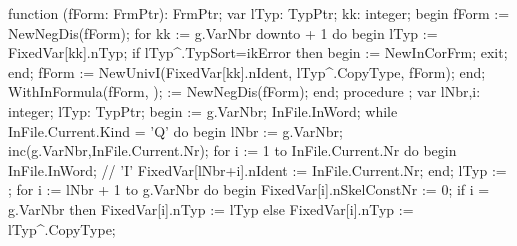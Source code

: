 \nwenddocs{}\endmoddef\nwstartdeflinemarkup{}\nwenddeflinemarkup
function (fForm: FrmPtr): FrmPtr;
var
   lTyp: TypPtr;
   kk: integer;
begin
   fForm := NewNegDis(fForm);
   for kk := g.VarNbr downto  + 1 do
   begin
      lTyp := FixedVar[kk].nTyp;
      if lTyp^.TypSort=ikError then
      begin
          := NewInCorFrm;
         exit;
      end;
      fForm := NewUnivI(FixedVar[kk].nIdent, lTyp^.CopyType, fForm);
   end;
   WithInFormula(fForm, );
    := NewNegDis(fForm);
end;
\eatline
{}\nwendcode{}\nwdocspar
\nwenddocs{}\endmoddef\nwstartdeflinemarkup{}\nwenddeflinemarkup
procedure ;
var
   lNbr,i: integer;
   lTyp: TypPtr;
begin
    := g.VarNbr;
   InFile.InWord;
   while InFile.Current.Kind = 'Q' do
   begin
      lNbr := g.VarNbr;
      inc(g.VarNbr,InFile.Current.Nr);
      for i := 1 to InFile.Current.Nr do
      begin
         InFile.InWord; // 'I'
         FixedVar[lNbr+i].nIdent := InFile.Current.Nr;
      end;
      lTyp := ;
      for i := lNbr + 1 to g.VarNbr do
      begin
         FixedVar[i].nSkelConstNr := 0;
         if i = g.VarNbr then
            FixedVar[i].nTyp := lTyp
         else
            FixedVar[i].nTyp := lTyp^.CopyType;
